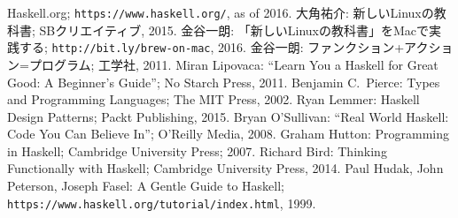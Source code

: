 \documentclass[a4paper,draft]{jsbook}
\begin{document}
\begin{thebibliography}{99}
 Haskell.org; \texttt{https://www.haskell.org/}, as of 2016.
 大角祐介: 新しいLinuxの教科書; SBクリエイティブ, 2015.
 金谷一朗: 「新しいLinuxの教科書」をMacで実践する; \texttt{http://bit.ly/brew-on-mac}, 2016.
 金谷一朗: ファンクション+アクション=プログラム; 工学社, 2011.
Miran Lipovaca: ``Learn You a Haskell for Great Good: A Beginner's Guide''; No Starch Press, 2011.
 Benjamin C.~Pierce: Types and Programming Languages; The MIT Press, 2002.
 Ryan Lemmer: Haskell Design Patterns; Packt Publishing, 2015.
 Bryan O'Sullivan: ``Real World Haskell: Code You Can Believe In''; O'Reilly Media, 2008.
 Graham Hutton: Programming in Haskell; Cambridge University Press; 2007.
 Richard Bird: Thinking Functionally with Haskell; Cambridge University Press, 2014.
 Paul Hudak, John Peterson, Joseph Fasel: A Gentle Guide to Haskell; \texttt{https://www.haskell.org/tutorial/index.html}, 1999.
\end{thebibliography}
\end{document}
